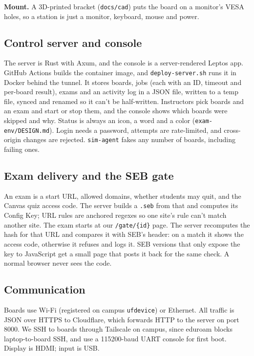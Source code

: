 \documentclass[11pt]{article}
\begin{document}
\textbf{Mount.} A 3D-printed bracket (\texttt{docs/cad}) puts the board on a monitor's VESA holes, so a station is just a monitor, keyboard, mouse and power.

\subsection{Control server and console}
The server is Rust with Axum, and the console is a server-rendered Leptos app. GitHub Actions builds the container image, and \texttt{deploy-server.sh} runs it in Docker behind the tunnel. It stores boards, jobs (each with an ID, timeout and per-board result), exams and an activity log in a JSON file, written to a temp file, synced and renamed so it can't be half-written. Instructors pick boards and an exam and start or stop them, and the console shows which boards were skipped and why. Status is always an icon, a word and a color (\texttt{exam-env/DESIGN.md}). Login needs a password, attempts are rate-limited, and cross-origin changes are rejected. \texttt{sim-agent} fakes any number of boards, including failing ones.

\subsection{Exam delivery and the SEB gate}
An exam is a start URL, allowed domains, whether students may quit, and the Canvas quiz access code. The server builds a \texttt{.seb} from that and computes its Config Key; URL rules are anchored regexes so one site's rule can't match another site. The exam starts at our \texttt{/gate/\{id\}} page. The server recomputes the hash for that URL and compares it with SEB's header: on a match it shows the access code, otherwise it refuses and logs it. SEB versions that only expose the key to JavaScript get a small page that posts it back for the same check. A normal browser never sees the code.

\subsection{Communication}
Boards use Wi-Fi (registered on campus \texttt{ufdevice}) or Ethernet. All traffic is JSON over HTTPS to Cloudflare, which forwards HTTP to the server on port 8000. We SSH to boards through Tailscale on campus, since eduroam blocks laptop-to-board SSH, and use a 115200-baud UART console for first boot. Display is HDMI; input is USB.
\end{document}
